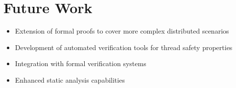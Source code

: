 \documentclass{article}
\begin{document}
\section{Future Work}
\begin{itemize}
    \item Extension of formal proofs to cover more complex distributed scenarios
    \item Development of automated verification tools for thread safety properties
    \item Integration with formal verification systems
    \item Enhanced static analysis capabilities
\end{itemize}
\end{document}
